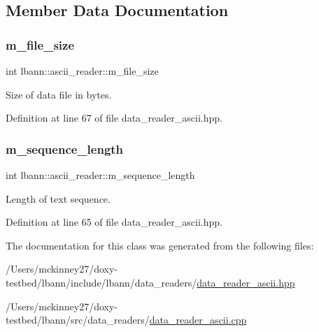 \subsection{Member Data Documentation}
\mbox{\label{classlbann_1_1ascii__reader_af684694c8c7faef296bf5af2530471f3}} 
\subsubsection{\texorpdfstring{m\+\_\+file\+\_\+size}{m\_file\_size}}
{\footnotesize\ttfamily int lbann\+::ascii\+\_\+reader\+::m\+\_\+file\+\_\+size\hspace{0.3cm}{\ttfamily [protected]}}

Size of data file in bytes. 

Definition at line 67 of file data\+\_\+reader\+\_\+ascii.\+hpp.

\mbox{\label{classlbann_1_1ascii__reader_a5788fa7418a086de968929d0d4cb4fa4}} 
\subsubsection{\texorpdfstring{m\+\_\+sequence\+\_\+length}{m\_sequence\_length}}
{\footnotesize\ttfamily int lbann\+::ascii\+\_\+reader\+::m\+\_\+sequence\+\_\+length\hspace{0.3cm}{\ttfamily [protected]}}

Length of text sequence. 

Definition at line 65 of file data\+\_\+reader\+\_\+ascii.\+hpp.



The documentation for this class was generated from the following files\+:\begin{DoxyCompactItemize}
\item 
/\+Users/mckinney27/doxy-\/testbed/lbann/include/lbann/data\+\_\+readers/\hyperlink{data__reader__ascii_8hpp}{data\+\_\+reader\+\_\+ascii.\+hpp}\item 
/\+Users/mckinney27/doxy-\/testbed/lbann/src/data\+\_\+readers/\hyperlink{data__reader__ascii_8cpp}{data\+\_\+reader\+\_\+ascii.\+cpp}\end{DoxyCompactItemize}
